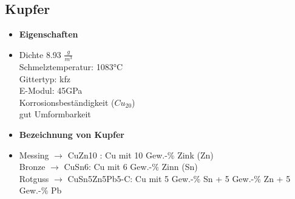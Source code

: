 \documentclass[8.5pt,twocolumn]{extarticle}
\begin{document}
    \subsection{Kupfer}
    \begin{minipage}[t]{0.5\columnwidth}
        \begin{itemize}[label={}, leftmargin=*, itemsep=0.01em]
            \item \textbf{Eigenschaften}
            \item Dichte 8.93 $\frac{g}{m^3}$\\ Schmelztemperatur: 1083°C \\ Gittertyp: kfz \\ E-Modul: 45GPa \\  Korrosionsbeständigkeit ($Cu_20$)\\ gut Umformbarkeit
        \end{itemize}
    \end{minipage}\hfill
    \begin{minipage}[t]{0.5\columnwidth}
        \begin{itemize}[label={}, leftmargin=*,  itemsep=0.01em]
            \item \textbf{Bezeichnung von Kupfer} 
            \item Messing $\rightarrow$ CuZn10 : Cu mit 10 Gew.-\% Zink (Zn) \\ Bronze $\rightarrow$ CuSn6: Cu mit 6 Gew.-\% Zinn (Sn) \\ Rotguss $\rightarrow$ CuSn5Zn5Pb5-C: Cu mit 5 Gew.-\% Sn + 5 Gew.-\% Zn + 5 Gew.-\% Pb
        \end{itemize} 
    \end{minipage}\hfill
\end{document}
